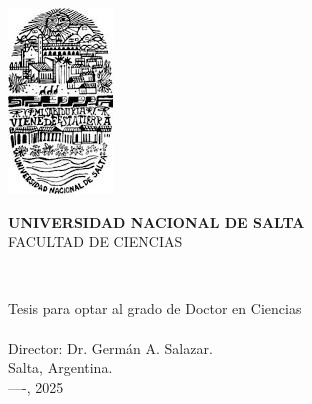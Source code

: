 \thispagestyle{empty}
\begin{center}
    \includegraphics[scale=0.75]{./figuras/logounsa1.jpg}\\
    \vspace{1cm}
    \begin{large}
        \textbf{UNIVERSIDAD NACIONAL DE SALTA}\\
        \vspace{0.2cm}
        FACULTAD DE CIENCIAS\\
        \vspace{0.2cm}
        \vspace{1cm}
    \end{large}
    \begin{large}
        \textbf{\MakeUppercase{\newtitle}}\\
        \vspace{1cm}
    \end{large}
    \begin{large}
        Tesis para optar al grado de Doctor en Ciencias \\
        \vspace{1cm}
        \textbf{\MakeUppercase{\newauthor}}\\
        \vspace{1.5cm}
        Director: Dr. Germán A. Salazar.\\ %
        \vspace{0.5cm}
        Salta, Argentina.\\
        ----, 2025 %
    \end{large}
\end{center}
